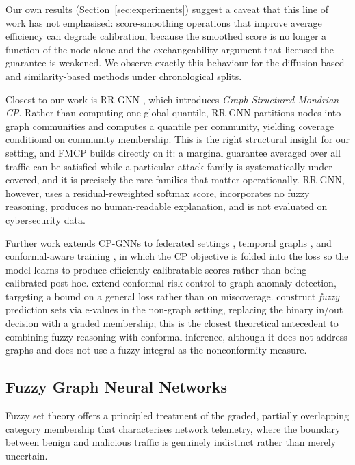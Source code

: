 Our own results (Section~\ref{sec:experiments}) suggest a caveat that this line
of work has not emphasised: score-smoothing operations that improve average
efficiency can degrade calibration, because the smoothed score is no longer a
function of the node alone and the exchangeability argument that licensed the
guarantee is weakened. We observe exactly this behaviour for the
diffusion-based and similarity-based methods under chronological splits.

Closest to our work is RR-GNN \citep{rrgnn}, which introduces
\emph{Graph-Structured Mondrian CP}. Rather than computing one global quantile,
RR-GNN partitions nodes into graph communities and computes a quantile per
community, yielding coverage conditional on community membership. This is the
right structural insight for our setting, and FMCP builds directly on it: a
marginal guarantee averaged over all traffic can be satisfied while a particular
attack family is systematically under-covered, and it is precisely the rare
families that matter operationally. RR-GNN, however, uses a residual-reweighted
softmax score, incorporates no fuzzy reasoning, produces no human-readable
explanation, and is not evaluated on cybersecurity data.

Further work extends CP-GNNs to federated settings \citep{akgul25}, temporal
graphs \citep{ncp2025,ncpnet25}, and conformal-aware training
\citep{confrank25}, in which the CP objective is folded into the loss so the
model learns to produce efficiently calibratable scores rather than being
calibrated post hoc. \citet{crcs_gad} extend conformal risk control to graph
anomaly detection, targeting a bound on a general loss rather than on
miscoverage. \citet{fuzzy_cp_evalue} construct \emph{fuzzy} prediction sets via
e-values in the non-graph setting, replacing the binary in/out decision with a
graded membership; this is the closest theoretical antecedent to combining fuzzy
reasoning with conformal inference, although it does not address graphs and does
not use a fuzzy integral as the nonconformity measure.

\subsection{Fuzzy Graph Neural Networks}

Fuzzy set theory offers a principled treatment of the graded, partially
overlapping category membership that characterises network telemetry, where the
boundary between benign and malicious traffic is genuinely indistinct rather
than merely uncertain.

